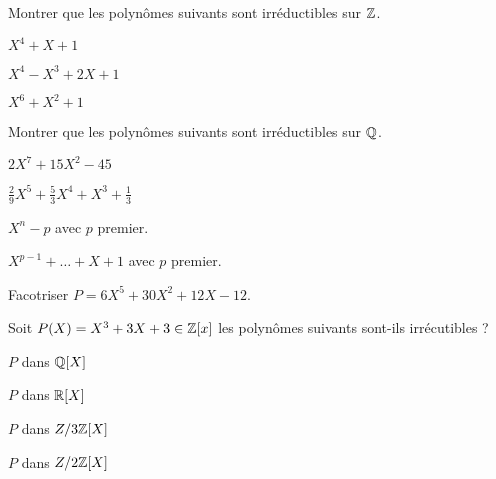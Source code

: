 \documentclass[french]{report}
\begin{document}
\begin{exo}
    Montrer que les polynômes suivants sont irréductibles sur \(\mathbb{Z}\).
    \begin{q}{1}
        \(X^4+X+1\)
    \end{q}
    \begin{q}{2}
        \(X^4-X^3+2X+1\)
    \end{q}
    \begin{q}{3}
        \(X^6+X^2+1\)
    \end{q}
\end{exo}

\begin{exo}
    Montrer que les polynômes suivants sont irréductibles sur \(\mathbb{Q}\).
    \begin{q}{1}
        \(2X^7+15X^2-45\)
    \end{q}
    \begin{q}{2}
        \(\frac29X^5+\frac53X^4+X^3+\frac13\)
    \end{q}
    \begin{q}{3}
        \(X^n-p\) avec \(p\) premier.
    \end{q}
    \begin{q}{4}
        \(X^{p-1}+\dots+X+1\) avec \(p\) premier.
    \end{q}
    \begin{q}{5}
        Facotriser \(P=6X^5+30X^2+12X-12\).
    \end{q}
\end{exo}

\begin{exo}
    Soit \(P(X)=X^3+3X+3\in\mathbb{Z}[x]\) les polynômes suivants sont-ils irrécutibles ?
    \begin{q}{1}
        \(P\) dans \(\mathbb{Q}[X]\)
    \end{q}
    \begin{q}{2}
        \(P\) dans \(\mathbb{R}[X]\)
    \end{q}
    \begin{q}{3}
        \(P\) dans \(Z/3\mathbb{Z}[X]\)
    \end{q}
    \begin{q}{4}
        \(P\) dans \(Z/2\mathbb{Z}[X]\)
    \end{q}
\end{exo}
\end{document}
